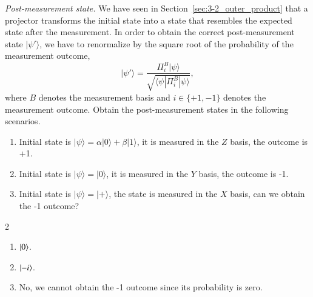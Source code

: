 \begin{exercise}
\emph{Post-measurement state.} We have seen in Section~\ref{sec:3-2_outer_product} that a projector transforms the initial state into a state that resembles the expected state after the measurement. In order to obtain the correct post-measurement state $|\psi'\rangle$, we have to renormalize by the square root of the probability of the measurement outcome,
\begin{equation*}
    |\psi'\rangle = \frac{\Pi^B_i|\psi\rangle}{\sqrt{\langle\psi|\Pi^B_i|\psi\rangle}},
\end{equation*}
where $B$ denotes the measurement basis and $i\in\{+1,-1\}$ denotes the measurement outcome. Obtain the post-measurement states in the following scenarios.
\begin{enumerate}[label=(\alph*)]
    \item Initial state is $|\psi\rangle=\alpha|0\rangle + \beta|1\rangle$, it is measured in the $Z$ basis, the outcome is +1.
    \item Initial state is $|\psi\rangle=|0\rangle$, it is measured in the $Y$ basis, the outcome is -1.
    \item Initial state is $|\psi\rangle=|+\rangle$, the state is measured in the $X$ basis, can we obtain the -1 outcome?
\end{enumerate}
\end{exercise}
\begin{solution}
\begin{multicols}{2}
    \begin{enumerate}[label=(\alph*)]
        \item $\left| 0 \right\rangle$.
        \item $\left| -i \right\rangle$.
        \item No, we cannot obtain the -1 outcome since its probability is zero.
    \end{enumerate}
\end{multicols}
\end{solution}

